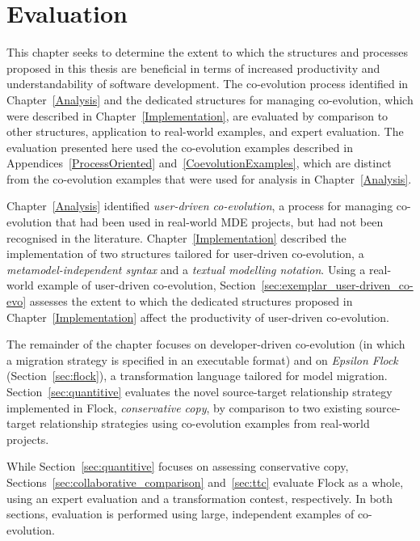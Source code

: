 
\chapter{Evaluation}
\label{Evaluation}
This chapter seeks to determine the extent to which the structures and processes proposed in this thesis are beneficial in terms of increased productivity and understandability of software development. The co-evolution process identified in Chapter~\ref{Analysis} and the dedicated structures for managing co-evolution, which were described in Chapter~\ref{Implementation}, are evaluated by comparison to other structures, application to real-world examples, and expert evaluation. The evaluation presented here used the co-evolution examples described in Appendices~\ref{ProcessOriented} and~\ref{CoevolutionExamples}, which are distinct from the co-evolution examples that were used for analysis in Chapter~\ref{Analysis}.

Chapter~\ref{Analysis} identified \emph{user-driven co-evolution}, a process for managing co-evolution that had been used in real-world MDE projects, but had not been recognised in the literature. Chapter~\ref{Implementation} described the implementation of two structures tailored for user-driven co-evolution, a \emph{metamodel-independent syntax} and a \emph{textual modelling notation}. Using a real-world example of user-driven co-evolution, Section~\ref{sec:exemplar_user-driven_co-evo} assesses the extent to which the dedicated structures proposed in Chapter~\ref{Implementation} affect the productivity of user-driven co-evolution.

The remainder of the chapter focuses on developer-driven co-evolution (in which a migration strategy is specified in an executable format) and on \emph{Epsilon Flock} (Section~\ref{sec:flock}), a transformation language tailored for model migration. Section~\ref{sec:quantitive} evaluates the novel source-target relationship strategy implemented in Flock, \emph{conservative copy}, by comparison to two existing source-target relationship strategies using co-evolution examples from real-world projects.

While Section~\ref{sec:quantitive} focuses on assessing conservative copy, Sections~\ref{sec:collaborative_comparison} and~\ref{sec:ttc} evaluate Flock as a whole, using an expert evaluation and a transformation contest, respectively. In both sections, evaluation is performed using large, independent examples of co-evolution.

